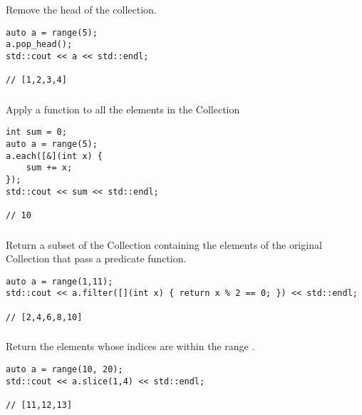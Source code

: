 Remove the head of the collection.

\begin{lstlisting}[title=example]
auto a = range(5);
a.pop_head();
std::cout << a << std::endl;

// [1,2,3,4]
\end{lstlisting}




\subsubsection{}

Apply a function to all the elements in the Collection

\begin{lstlisting}[title=example]
int sum = 0;
auto a = range(5);
a.each([&](int x) {
    sum += x;
});
std::cout << sum << std::endl;

// 10
\end{lstlisting}




\subsubsection{}

Return a subset of the Collection containing the elements of the original Collection that pass a predicate function.

\begin{lstlisting}[title=example]
auto a = range(1,11);
std::cout << a.filter([](int x) { return x % 2 == 0; }) << std::endl;

// [2,4,6,8,10]
\end{lstlisting}




\subsubsection{}

Return the elements whose indices are within the range \code{[low, high)}.

\begin{lstlisting}[title=example]
auto a = range(10, 20);
std::cout << a.slice(1,4) << std::endl;

// [11,12,13]
\end{lstlisting}





